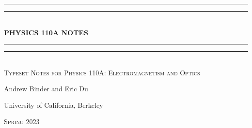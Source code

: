 \documentclass{book}
\begin{document}
    \begin{titlepage}
        \centering
        \vspace*{\baselineskip}\vspace{200pt}
        \rule{\textwidth}{1.6pt}\vspace*{-\baselineskip}\vspace*{2pt}
        \rule{\textwidth}{0.4pt}\\[\baselineskip]
        {\Huge \bfseries \MakeUppercase{Physics 110A} NOTES}\\[0.2\baselineskip]
        \rule{\textwidth}{0.4pt}\vspace*{-\baselineskip}\vspace{3.2pt}
        \rule{\textwidth}{1.6pt}\\[\baselineskip]
        \scshape
		Typeset Notes for Physics 110A: Electromagnetism and Optics
        \par
        \vspace*{2pt}
        {\Large Andrew Binder and Eric Du}\\
        {\large University of California, Berkeley\par}
        {\scshape Spring 2023} \\
    \end{titlepage}
    \setcounter{chapter}{-1}


		
		
		
	
\end{document}

